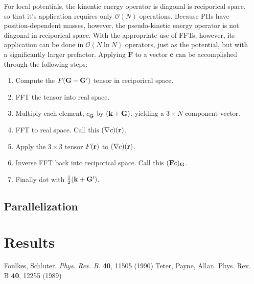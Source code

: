 \documentclass{article}
\begin{document}
For local potentials, the kinentic energy operator is diagonal is
reciporical space, so that it's application requires only
$\mathcal{O}(N)$ operations.  Because PHs have position-dependent
masses, however, the pseudo-kinetic energy operator is not diagonal in
reciporical space.  With the appropriate use of FFTs, however, its
application can be done in $\mathcal{O}(N \ln N)$ operators, just as
the potential, but with a significantly larger prefactor.  Applying
$\mathbf{F}$ to a vector $\mathbf{c}$ can be accomplished through the
following steps:
\begin{enumerate}
\item Compute the $F(\mathbf{G}-\mathbf{G'})$ tensor in reciporical space.
\item FFT the tensor into real space.
\item Multiply each element, $c_\mathbf{G}$ by $(\mathbf{k} + \mathbf{G})$, yielding
  a $3\times N$ component vector.
\item FFT to real space.  Call this $(\nabla c)(\mathbf{r})$.
\item Apply the $3\times 3$ tensor $F(\mathbf{r})$ to $(\nabla c)(\mathbf{r})$.
\item Inverse FFT back into reciporical space.  Call this
  $(\mathbf{F}c)_{\mathbf{G}}$.
\item Finally dot with $\frac{1}{2}(\mathbf{k} + \mathbf{G'})$.
\end{enumerate}


\subsection{Parallelization}


\section{Results}

\begin{thebibliography}{9}
  Foulkes, Schluter. {\em Phys. Rev. B.} {\bf 40}, 11505 (1990)
 Teter, Payne, Allan. Phys. Rev. B {\bf 40}, 12255 (1989)

\end{thebibliography}
\end{document}
